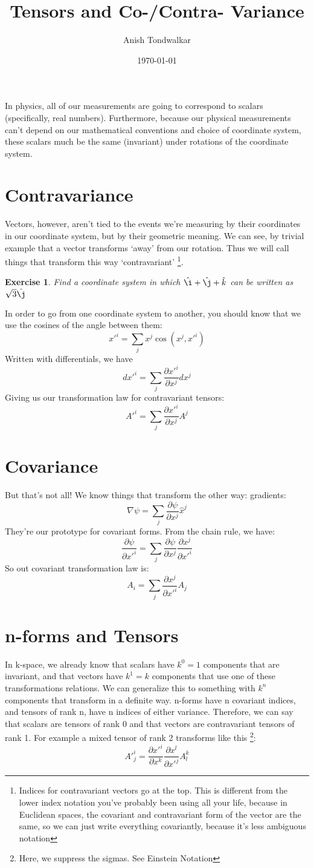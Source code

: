 \documentclass[11pt,notitlepage]{article}
\title{Tensors and Co-/Contra- Variance}
\author{Anish Tondwalkar}
\date{\today}
\newtheorem{exc}{Exercise}[section]
\begin{document}
\maketitle
In physics, all of our measurements are going to correspond to scalars (specifically, real numbers). 
Furthermore, because our physical measurements can't depend on our mathematical conventions and choice of coordinate system,
these scalars much be the same (invariant) under rotations of the coordinate system.
\section{Contravariance}
Vectors, however, aren't tied to the events we're measuring by their coordinates in our coordinate system, but by their geometric meaning.
We can see, by trivial example that a vector transforms `away' from our rotation. 
Thus we will call things that transform this way `contravariant'
\footnote{Indices for contravariant vectors go at the top. This is different from the lower index notation you've probably been using all your life, because in Euclidean spaces, the covariant and contravariant form of the vector are the same, so we can just write everything covariantly, because it's less ambiguous notation}. 
\begin{exc}
Find a coordinate system in which
$\hat\i + \hat\j + \hat k$
 can be written as $\sqrt3 \hat\j$
\end{exc}
In order to go from one coordinate system to another, you should know that we use the cosines of the angle between them:
$$ x'^i = \sum_j x^j \cos(x^j,x'^i) $$
Written with differentials, we have
$$ dx'^i = \sum_j \frac{\partial x'^i}{\partial x^j} dx^j $$
Giving us our transformation law for contravariant tensors:
$$ A'^i = \sum_j \frac{\partial x'^i}{\partial x^j} A^j $$
\section{Covariance}
But that's not all! We know things that transform the other way: gradients:
$$ \nabla \psi = \sum_j \frac{\partial \psi}{\partial x^j} \hat x^j $$
 They're our prototype for covariant forms. 
From the chain rule, we have: 
$$\frac{\partial \psi}{\partial x'^i} = \sum_j \frac{\partial \psi}{\partial x^j} \frac{\partial x^j}{\partial x'^i} $$
So out covariant transformation law is:
$$ A_i = \sum_j \frac{\partial x^j}{\partial x'^i} A_j$$

\section{n-forms and Tensors}
In k-space, we already know that scalars have $k^0=1$ components that are invariant, and that vectors have $k^1=k$ components that use one of these transformations relations. We can generalize this to something with $k^n$ components that transform in a definite way. n-forms have n covariant indices, and tensors of rank n, have n indices of either variance. Therefore, we can say that scalars are tensors of rank 0 and that vectors are contravariant tensors of rank 1. For example a mixed tensor of rank 2 transforms like this \footnote{Here, we suppress the sigmas. See Einstein Notation}:
$$A'^i_j =  \frac{\partial x'^i}{\partial x^k}\frac{\partial x^l}{\partial x'^j} A^k_l $$
\end{document}
